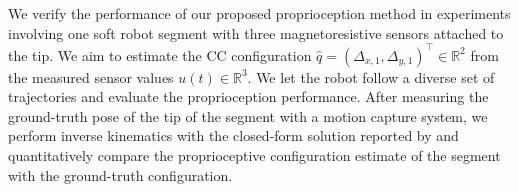 
We verify the performance of our proposed proprioception method in experiments involving one soft robot segment with three magnetoresistive sensors attached to the tip.
We aim to estimate the CC configuration $\hat{q} = (\Delta_{x,1}, \Delta_{y,1})^\top \in \mathbb{R}^2$ from the measured sensor values $u(t) \in \mathbb{R}^3$.
We let the robot follow a diverse set of trajectories and evaluate the proprioception performance.
After measuring the ground-truth pose of the tip of the segment with a motion capture system, we perform inverse kinematics with the closed-form solution reported by \citet{della2020improved} and quantitatively compare the proprioceptive configuration estimate of the segment with the ground-truth configuration.

